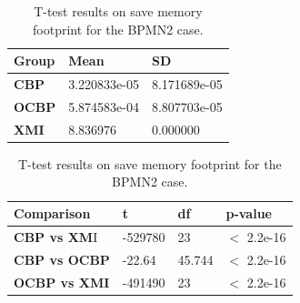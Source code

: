 \documentclass{llncs}
\begin{document}
    \begin{table}[ht]
        \centering
        \label{table:ttest_save_memory_bpmn2}
        \caption{T-test results on save memory footprint for the BPMN2 case.}
        \begin{minipage}{0.44\textwidth}
            \centering
            \begin{tabular}{|p{}|p{}|p{}|}
                \hline 
                \textbf{Group}  & \textbf{Mean} & \textbf{SD} \\ 
                \hline 
                \textbf{CBP} & 3.220833e-05  & 8.171689e-05 \\ 
                \hline 
                \textbf{OCBP} & 5.874583e-04 & 8.807703e-05  \\ 
                \hline 
                \textbf{XMI} & 8.836976   & 0.000000 \\ 
                \hline 
            \end{tabular} 
        \end{minipage}
        \hfill
        \begin{minipage}{0.54\textwidth}
            \centering
            \begin{tabular}{|p{}|p{}|p{}|p{}|}
                \hline 
                \textbf{Comparison} & \textbf{t}  & \textbf{df} & \textbf{p-value} \\ 
                \hline 
                \textbf{CBP vs XM}I & -529780  & 23 & $<$ 2.2e-16 \\ 
                \hline 
                \textbf{CBP vs OCBP} & -22.64 & 45.744 & $<$ 2.2e-16 \\ 
                \hline 
                \textbf{OCBP vs XMI} & -491490   & 23  & $<$ 2.2e-16 \\ 
                \hline 
            \end{tabular} 
        \end{minipage}
    \end{table}
    
\end{document}
